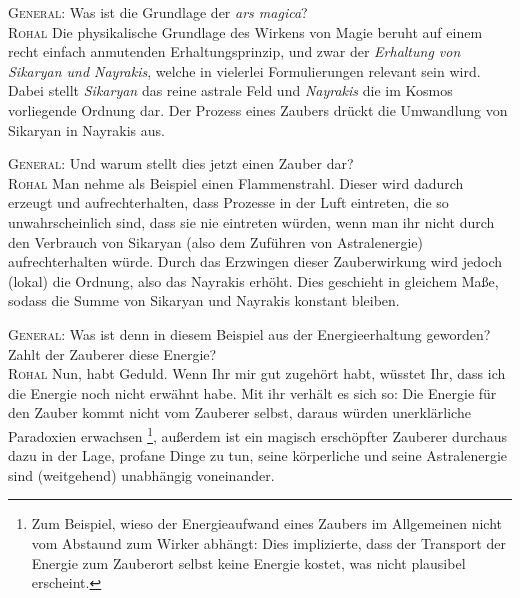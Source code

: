 \begin{bla}{\textsc{General}: Was ist die Grundlage der \emph{ars magica}? \\
\textsc{Rohal}}
Die physikalische Grundlage des Wirkens von Magie beruht auf einem recht einfach anmutenden Erhaltungsprinzip, und zwar der \emph{Erhaltung von Sikaryan und Nayrakis}, welche in vielerlei Formulierungen relevant sein wird. Dabei stellt \emph{Sikaryan} das reine astrale Feld und \emph{Nayrakis} die im Kosmos vorliegende Ordnung dar. Der Prozess eines Zaubers drückt die Umwandlung von Sikaryan in Nayrakis aus.
\end{bla}
\begin{bla}{\textsc{General}: Und warum stellt dies jetzt einen Zauber dar? \\ 
\textsc{Rohal}}
Man nehme als Beispiel einen Flammenstrahl. Dieser wird dadurch erzeugt und aufrechterhalten, dass Prozesse in der Luft eintreten, die so unwahrscheinlich sind, dass sie nie eintreten würden, wenn man ihr nicht durch den Verbrauch von Sikaryan (also dem Zuführen von Astralenergie) aufrechterhalten würde. Durch das Erzwingen dieser Zauberwirkung wird jedoch (lokal) die Ordnung, also das Nayrakis erhöht. Dies geschieht in gleichem Maße, sodass die Summe von Sikaryan und Nayrakis konstant bleiben. 
\end{bla}
\begin{bla}{\textsc{General}: Was ist denn in diesem Beispiel aus der Energieerhaltung geworden? Zahlt der Zauberer diese Energie? \\ \textsc{Rohal}}
Nun, habt Geduld. Wenn Ihr mir gut zugehört habt, wüsstet Ihr, dass ich die Energie noch nicht erwähnt habe. Mit ihr verhält es sich so: Die Energie für den Zauber kommt nicht vom Zauberer selbst, daraus würden unerklärliche Paradoxien erwachsen \footnote{Zum Beispiel, wieso der Energieaufwand eines Zaubers im Allgemeinen nicht vom Abstaund zum Wirker abhängt: Dies implizierte, dass der Transport der Energie zum Zauberort selbst keine Energie kostet, was nicht plausibel erscheint.}, außerdem ist ein magisch erschöpfter Zauberer durchaus dazu in der Lage, profane Dinge zu tun, seine körperliche und seine Astralenergie sind (weitgehend) unabhängig voneinander. 
\end{bla}
